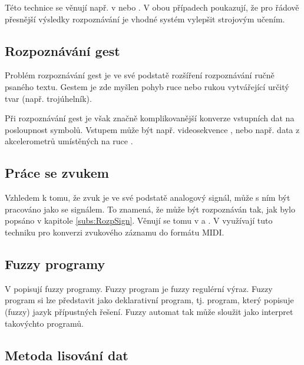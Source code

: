 \documentclass[a4paper,10pt]{article}
\begin{document}
Této technice se věnují např. v \cite{AstGariGonVillFar-ApprStrMatUsiDefFuzzAutLearExpr} nebo \cite{WeeFu-FormFuzAutAppModLeaSys}. V obou případech poukazují, že pro řádově přesnější výsledky rozpoznávání je vhodné systém vylepšit strojovým učením.

\subsection{Rozpoznávání gest} \label{subs:GestRec}
Problém rozpoznávání gest je ve své podstatě rozšíření rozpoznávání ručně psaného textu. Gestem je zde myšlen pohyb ruce nebo rukou vytvářející určitý tvar (např. trojúhelník).

Při rozpoznávání gest je však značně komplikovanější konverze vstupních dat na posloupnost symbolů. Vstupem může být např. videosekvence \cite{Tho-FinFuzzAutRegFuzLangPatRec}, nebo např. data z akcelerometrů umístěných na ruce \cite{BaiTri-PattRecUsiTemFuzzAut}.

\subsection{Práce se zvukem}
Vzhledem k tomu, že zvuk je ve své podstatě analogový signál, může s ním být pracováno jako se signálem. To znamená, že může být rozpoznáván tak, jak bylo popsáno v kapitole \ref{subs:RozpSign}. Věnují se tomu v \cite{ForBel-GenMusAccUsFinStaTra} a \cite{OliWag-ComMusNeuNetProFiStMa}. V \cite{ForBel-GenMusAccUsFinStaTra} využívají tuto techniku pro konverzi zvukového záznamu do formátu MIDI.

\subsection{Fuzzy programy}
V \cite{Cha-ExeFuzProUsFiStaMa} popisují fuzzy programy. Fuzzy program je fuzzy regulérní výraz. Fuzzy program si lze představit jako deklarativní program, tj. program, který popisuje (fuzzy) jazyk přípustných řešení. Fuzzy automat tak může sloužit jako interpret takovýchto programů. 

\subsection{Metoda lisování dat} \label{subs:DataPresTech}
\end{document}
